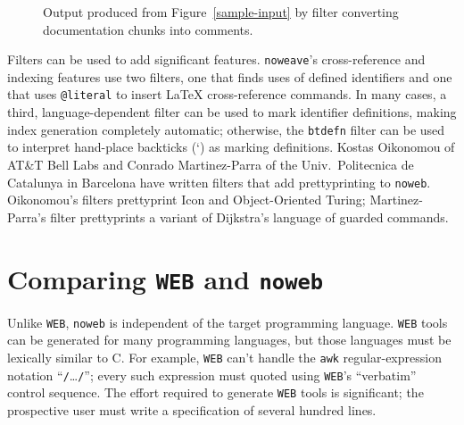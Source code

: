 \begin{figure}
\caption{Output produced from
Figure~\protect\ref{sample-input} by filter converting documentation
chunks into comments.}
\label{nountangle-output}
\end{figure}



Filters can be used to add significant features.
\verb+noweave+'s cross-reference and indexing features use two
filters, one that finds uses of defined identifiers and one that
uses \verb+@literal+ to insert {\LaTeX} cross-reference
commands.
In many cases, a third, language-dependent filter can be used to
mark identifier definitions,
making index generation completely automatic;
otherwise, the \verb+btdefn+ filter can be used to interpret
hand-place backticks (`) as marking definitions.
Kostas Oikonomou of AT\&T Bell Labs and Conrado Martinez-Parra of
the Univ.\ Politecnica de Catalunya in Barcelona have written filters
that add prettyprinting to {\tt noweb}.
Oikonomou's filters prettyprint Icon and Object-Oriented Turing;
Martinez-Parra's filter prettyprints a variant of Dijkstra's language
of guarded commands.


\section{Comparing {\tt WEB} and {\tt noweb}}

Unlike {\tt WEB},
\verb+noweb+ is independent of the target programming language.
{\tt WEB} tools can be generated for many programming languages,
but those languages must be lexically similar to C.
For example, {\tt WEB} can't handle the \verb+awk+ regular-expression
notation ``\verb+/+\ldots\verb+/+''; every such expression must quoted
using {\tt WEB}'s ``verbatim'' control sequence.
The effort required to
generate {\tt WEB} tools is significant; the prospective user must
write a specification of several hundred
lines.


